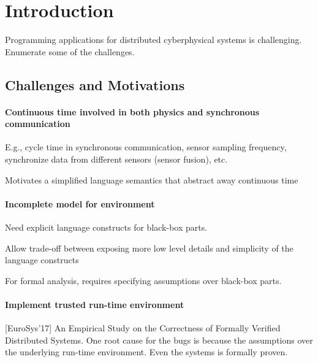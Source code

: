\section{Introduction}
\label{sec:intro}


Programming applications for distributed cyberphysical systems is challenging.
Enumerate some of the challenges.

\subsection{Challenges and Motivations~}

\paragraph{Continuous time involved in both physics and synchronous communication}
E.g., cycle time in synchronous communication, sensor sampling frequency, synchronize data from different sensors (sensor fusion), etc.

Motivates a simplified language semantics that abstract away continuous time


\paragraph{Incomplete model for environment}

Need explicit language constructs for black-box parts.

Allow trade-off between exposing more low level details and simplicity of the language constructs

For formal analysis, requires specifying assumptions over black-box parts.


\paragraph{Implement trusted run-time environment}


[EuroSys'17] An Empirical Study on the Correctness of Formally Verified Distributed Systems.
One root cause for the bugs is because the assumptions over the underlying run-time environment. Even the systems is formally proven.

